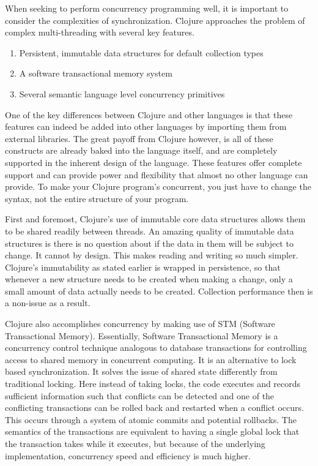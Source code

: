     When seeking to perform concurrency programming well, it is important to consider the complexities of synchronization. Clojure approaches the problem of complex multi-threading with several key features.
    
    \begin{enumerate}
        \item Persistent, immutable data structures for default collection types
        \item A software transactional memory system
        \item Several semantic language level concurrency primitives
    \end{enumerate}
    
    One of the key differences between Clojure and other languages is that these features can indeed be added into other languages by importing them from external libraries. The great payoff from Clojure however, is all of these constructs are already baked into the language itself, and are completely supported in the inherent design of the language. These features offer complete support and can provide power and flexibility that almost no other language can provide. To make your Clojure program's concurrent, you just have to change the syntax, not the entire structure of your program.
    
    First and foremost, Clojure's use of immutable core data structures allows them to be shared readily between threads. An amazing quality of immutable data structures is there is no question about if the data in them will be subject to change. It cannot by design. This makes reading and writing so much simpler. Clojure's immutability as stated earlier is wrapped in persistence, so that  whenever a new structure needs to be created when making a change, only a small amount of data actually needs to be created. Collection performance then is a non-issue as a result.
    
    Clojure also accomplishes concurrency by making use of STM (Software Transactional Memory). Essentially, Software Transactional Memory is a concurrency control technique analogous to database transactions for controlling access to shared memory in concurrent computing. It is an alternative to lock based synchronization. It solves the issue of shared state differently from traditional locking. Here instead of taking locks, the code executes and records sufficient information such that conflicts can be detected and one of the conflicting transactions can be rolled back and restarted when a conflict occurs. This occurs through a system of atomic commits and potential rollbacks. The semantics of the transactions are equivalent to having a single global lock that the transaction takes while it executes, but because of the underlying implementation, concurrency speed and efficiency is much higher. \cite{Extending_STM_JournalArticle_Jensen}
    \cite{MUTS_SoftwareTransactionalMemory_JournalArticle_Goodman}
    
